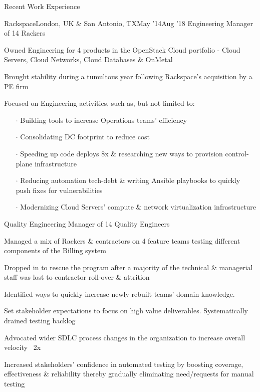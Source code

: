 \documentclass{resume} %
\begin{document}
\begin{rSection}{Recent Work Experience}
\begin{rSubsection}{Rackspace}{London, UK \& San Antonio, TX}{May '14}{Aug '18}
  {Engineering Manager of 14 Rackers}
  \item Owned Engineering for 4 products in the OpenStack Cloud portfolio - Cloud Servers, Cloud Networks, Cloud Databases \& OnMetal
  \item Brought stability during a tumultous year following Rackspace's acquisition by a PE firm
  \item Focused on Engineering activities, such as, but not limited to:
    \vspace{-0.5em}
    \begin{itemize}  \itemsep0.5pt \parskip0pt
    \item[$\cdot$] Building tools to increase Operations teams' efficiency
    \item[$\cdot$] Consolidating DC footprint to reduce cost
    \item[$\cdot$] Speeding up code deploys 8x \& researching new ways to provision control-plane infrastructure
    \item[$\cdot$] Reducing automation tech-debt \& writing Ansible playbooks to quickly push fixes for vulnerabilities
    \item[$\cdot$] Modernizing Cloud Servers' compute \& network virtualization infrastructure
    \end{itemize}
\end{rSubsection}\vspace{-1em}

  
\begin{rSubsection}{}{}{}{}
{Quality Engineering Manager of 14 Quality Engineers}
  \item Managed a mix of Rackers \& contractors on 4 feature teams testing different components of the Billing system
\item Dropped in to rescue the program after a majority of the technical \& managerial staff was lost to contractor roll-over \& attrition
\item Identified ways to quickly increase newly rebuilt teams' domain knowledge. %
\item Set stakeholder expectations to focus on high value deliverables. Systematically drained testing backlog
\item Advocated wider SDLC process changes in the organization to increase overall velocity ~2x
\item Increased stakeholders' confidence in automated testing by boosting coverage, effectiveness \& reliability thereby gradually eliminating need/requests for manual testing
  

\end{rSubsection}
\end{rSection}
\end{document}
